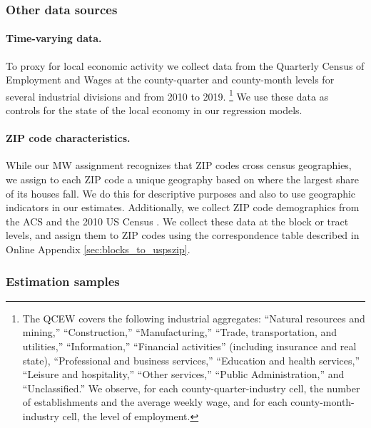 \subsubsection{Other data sources}\label{sec:data_other}

\paragraph{Time-varying data.}

To proxy for local economic activity we collect data from the 
Quarterly Census of Employment and Wages \parencite[QCEW;][]{QCEW} 
at the county-quarter and county-month levels for several industrial divisions 
and from 2010 to 2019.%
\footnote{The QCEW covers the following industrial aggregates: 
    ``Natural resources and mining,'' ``Construction,'' ``Manufacturing,'' 
    ``Trade, transportation, and utilities,'' ``Information,'' 
    ``Financial activities'' (including insurance and real state), 
    ``Professional and business services,'' ``Education and health services,'' 
    ``Leisure and hospitality,'' ``Other services,'' ``Public Administration,''
    and ``Unclassified.''
    We observe, for each county-quarter-industry cell, the number of 
    establishments and the average weekly wage, and for each 
    county-month-industry cell, the level of employment.}
We use these data as controls for the state of the local economy in our 
regression models.

\paragraph{ZIP code characteristics.}

While our MW assignment recognizes that ZIP codes cross census geographies, 
we assign to each ZIP code a unique geography based on where the largest 
share of its houses fall.
We do this for descriptive purposes and also to use geographic indicators  
in our estimates.
Additionally, we collect ZIP code demographics from the ACS 
\parencite{CensusACS} and the 2010 US Census \parencite{CensusDecennial}.
We collect these data at the block or tract levels, and assign them to ZIP codes
using the correspondence table described in Online Appendix 
\ref{sec:blocks_to_uspszip}.

\subsubsection{Estimation samples}\label{sec:data_final_panel}

